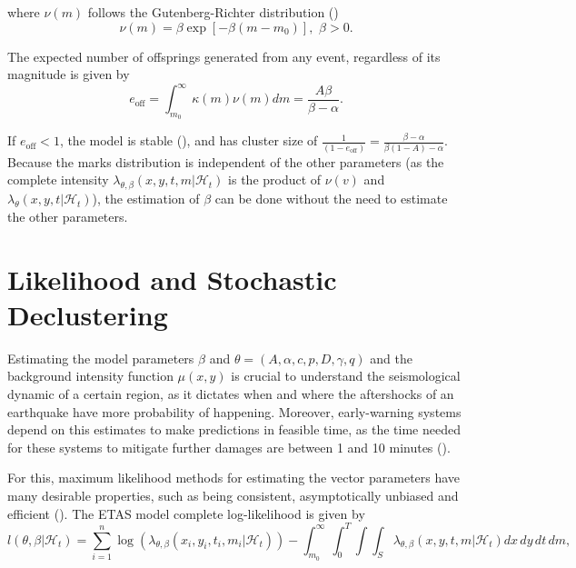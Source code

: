 \noindent where $\nu(m)$ follows the Gutenberg-Richter distribution ()
\begin{equation*}
  \nu(m) = \beta\exp[-\beta(m - m_{0})], \,\, \beta > 0.
\end{equation*}

The expected number of offsprings generated from any event, regardless of its magnitude is given by
\begin{equation}
  \label{eq-expect-triggered}
  e_{\mathrm{off}} = \int_{m_{0}}^{\infty}\kappa(m)\nu(m)dm = \frac{A\beta}{\beta - \alpha}.
\end{equation}

If $e_{\mathrm{off}} < 1$, the model is stable (), and has cluster size of $\frac{1}{(1 - e_{\mathrm{off}})} = \frac{\beta - \alpha}{\beta(1 - A) - \alpha}$. Because the marks distribution is independent of the other parameters (as the complete intensity $\lambda_{\theta,\beta}(x,y,t,m|\mathcal{H}_{t})$ is the product of $\nu(v)$ and $\lambda_{\theta}(x,y,t|\mathcal{H}_{t})$), the estimation of $\beta$ can be done without the need to estimate the other parameters.

\section{Likelihood and Stochastic Declustering}
\label{sec-likelihood-etas}

Estimating the model parameters $\beta$ and $\theta = (A, \alpha, c, p, D, \gamma, q)$ and the background intensity function $\mu(x,y)$ is crucial to understand the seismological dynamic of a certain region, as it dictates when and where the aftershocks of an earthquake have more probability of happening. Moreover, early-warning systems depend on this estimates to make predictions in feasible time, as the time needed for these systems to mitigate further damages are between 1 and 10 minutes ().

For this, maximum likelihood methods for estimating the vector parameters have many desirable properties, such as being consistent, asymptotically unbiased and efficient (). The ETAS model complete log-likelihood is given by
\begin{equation}
  \label{eq-etas-loglik}
  l(\theta,\beta|\mathcal{H}_{t}) = \sum_{i = 1}^{n}\log(\lambda_{\theta,\beta}(x_{i},y_{i},t_{i},m_{i}|\mathcal{H}_{t})) - \int_{m_{0}}^{\infty}\int_{0}^{T}\int\int_{S}\lambda_{\theta,\beta}(x,y,t,m|\mathcal{H}_{t})dx\, dy\, dt\, dm,
\end{equation}

